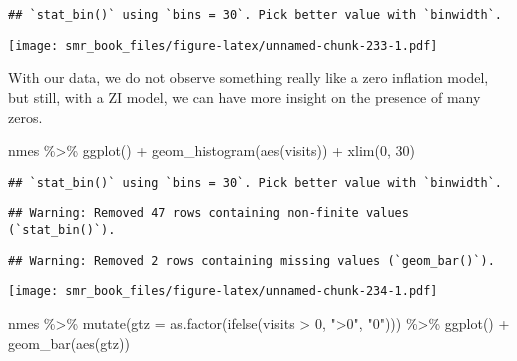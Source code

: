 \documentclass[
  oneside]{book}
\newenvironment{Shaded}{\begin{snugshade}}{\end{snugshade}}
\newcommand{\AttributeTok}[1]{\textcolor[rgb]{0.77,0.63,0.00}{#1}}
\newcommand{\DecValTok}[1]{\textcolor[rgb]{0.00,0.00,0.81}{#1}}
\newcommand{\FunctionTok}[1]{\textcolor[rgb]{0.00,0.00,0.00}{#1}}
\newcommand{\NormalTok}[1]{#1}
\newcommand{\SpecialCharTok}[1]{\textcolor[rgb]{0.00,0.00,0.00}{#1}}
\newcommand{\StringTok}[1]{\textcolor[rgb]{0.31,0.60,0.02}{#1}}
\begin{document}
\begin{verbatim}
## `stat_bin()` using `bins = 30`. Pick better value with `binwidth`.
\end{verbatim}

\texttt{[image: smr\_book\_files/figure-latex/unnamed-chunk-233-1.pdf]}

With our data, we do not observe something really like a zero inflation
model, but still, with a ZI model, we can have more insight on the
presence of many zeros.

\begin{Shaded}
\begin{Highlighting}[]
\NormalTok{nmes }\SpecialCharTok{\%\textgreater{}\%}
  \FunctionTok{ggplot}\NormalTok{() }\SpecialCharTok{+}
  \FunctionTok{geom\_histogram}\NormalTok{(}\FunctionTok{aes}\NormalTok{(visits)) }\SpecialCharTok{+}
  \FunctionTok{xlim}\NormalTok{(}\DecValTok{0}\NormalTok{, }\DecValTok{30}\NormalTok{)}
\end{Highlighting}
\end{Shaded}

\begin{verbatim}
## `stat_bin()` using `bins = 30`. Pick better value with `binwidth`.
\end{verbatim}

\begin{verbatim}
## Warning: Removed 47 rows containing non-finite values (`stat_bin()`).
\end{verbatim}

\begin{verbatim}
## Warning: Removed 2 rows containing missing values (`geom_bar()`).
\end{verbatim}

\texttt{[image: smr\_book\_files/figure-latex/unnamed-chunk-234-1.pdf]}

\begin{Shaded}
\begin{Highlighting}[]
\NormalTok{nmes }\SpecialCharTok{\%\textgreater{}\%}
  \FunctionTok{mutate}\NormalTok{(}\AttributeTok{gtz =} \FunctionTok{as.factor}\NormalTok{(}\FunctionTok{ifelse}\NormalTok{(visits }\SpecialCharTok{\textgreater{}} \DecValTok{0}\NormalTok{, }\StringTok{"\textgreater{}0"}\NormalTok{, }\StringTok{"0"}\NormalTok{))) }\SpecialCharTok{\%\textgreater{}\%}
  \FunctionTok{ggplot}\NormalTok{() }\SpecialCharTok{+}
  \FunctionTok{geom\_bar}\NormalTok{(}\FunctionTok{aes}\NormalTok{(gtz))}
\end{Highlighting}
\end{Shaded}
\end{document}
